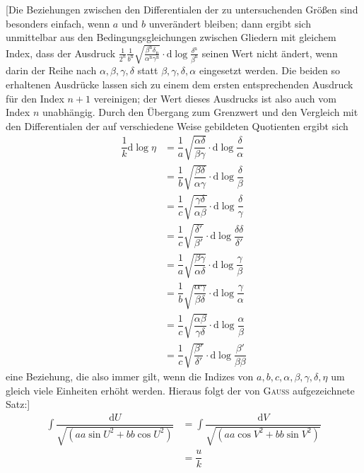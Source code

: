 \begingroup
\renewcommand{\arraystretch}{1.45}

[Die Beziehungen zwischen den Differentialen der zu untersuchenden Größen sind besonders einfach, wenn $a$ und $b$ unverändert bleiben; dann ergibt sich unmittelbar aus den Bedingungsgleichungen zwischen Gliedern mit gleichem Index, dass der Ausdruck
$\frac{1}{2^n}\frac{1}{b^{\mathrm n}}\surd{\frac{\beta^{\mathrm n}\delta_{\mathrm n}}{\alpha^{\mathrm n}\gamma^{\mathrm n}}}\cdot\mathrm{d}\log\frac{\delta^{\mathrm n}}{\beta^{\mathrm n}}$
seinen Wert nicht ändert, wenn darin der Reihe nach $\alpha,\allowbreak \beta,\allowbreak \gamma,\allowbreak \delta$ statt $\beta,\allowbreak \gamma,\allowbreak \delta,\allowbreak \alpha$ eingesetzt werden. Die beiden so erhaltenen Ausdrücke lassen sich zu einem dem ersten entsprechenden Ausdruck für den Index $n+1$ vereinigen; der Wert dieses Ausdrucks ist also auch vom Index $n$ unabhängig. Durch den Übergang zum Grenzwert und den Vergleich mit den Differentialen der auf verschiedene Weise gebildeten Quotienten ergibt sich
\[
\begin{aligned}\dfrac{1}{k}\mathrm{d}\log\eta
&=\dfrac{1}{a}\surd{\dfrac{\alpha\delta}{\beta\gamma}}\cdot\mathrm{d}\log\dfrac{\delta}{\alpha}
\\[7pt]&=\dfrac{1}{b}\surd{\dfrac{\beta\delta}{\alpha\gamma}}\cdot\mathrm{d}\log\dfrac{\delta}{\beta}
\\[7pt]&=\dfrac{1}{c}\surd{\dfrac{\gamma\delta}{\alpha\beta}}\cdot\mathrm{d}\log\dfrac{\delta}{\gamma}
\\[7pt]&=\dfrac{1}{c}\surd{\dfrac{\delta'}{\beta'}}\cdot\mathrm{d}\log\dfrac{\delta\delta}{\delta'}
\\[7pt]&=\dfrac{1}{a}\surd{\dfrac{\beta\gamma}{\alpha\delta}}\cdot\mathrm{d}\log\dfrac{\gamma}{\beta}
\\[7pt]&=\dfrac{1}{b}\surd{\dfrac{\alpha\gamma}{\beta\delta}}\cdot\mathrm{d}\log\dfrac{\gamma}{\alpha}
\\[7pt]&=\dfrac{1}{c}\surd{\dfrac{\alpha\beta}{\gamma\delta}}\cdot\mathrm{d}\log\dfrac{\alpha}{\beta}
\\[7pt]&=\dfrac{1}{c}\surd{\dfrac{\beta'}{\delta'}}\cdot\mathrm{d}\log\dfrac{\beta'}{\beta\beta}\end{aligned}
\]
eine Beziehung, die also immer gilt, wenn die Indizes von $a,\allowbreak b,\allowbreak c,\allowbreak \alpha,\allowbreak \beta,\allowbreak \gamma,\allowbreak \delta,\allowbreak \eta$ um gleich viele Einheiten erhöht werden. Hieraus folgt der von \textsc{Gauss} aufgezeichnete Satz:]
\[
\begin{aligned}\int\dfrac{\mathrm{d}U}{\surd{(aa\sin U^2+bb\cos U^2)}}
&=\int\dfrac{\mathrm{d}V}{\surd{(aa\cos V^2+bb\sin V^2)}}\\[6pt]&=\dfrac{u}{k}\end{aligned}
\]

